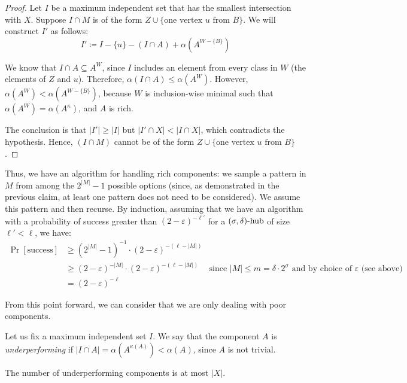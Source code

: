 \begin{proof}
    Let $I$ be a maximum independent set that has the smallest intersection with $X$. Suppose $I \cap M$ is of the form $Z \cup \{\text{one vertex $u$ from $B$}\}$. We will construct $I'$ as follows: $$I'\coloneqq I - \{u\} - (I \cap A) + \alpha(A^{W - \{B\}})$$

     We know that $I \cap A \subseteq A^W$, since $I$ includes an element from every class in $W$ (the elements of $Z$ and $u$). Therefore, $\alpha(I \cap A) \leq \alpha(A^W)$. However, $\alpha(A^W) < \alpha(A^{W - \{B\}})$, because $W$ is inclusion-wise minimal such that $\alpha(A^W) = \alpha(A^\kappa)$, and $A$ is rich.

    The conclusion is that $|I'| \geq |I|$ but $|I' \cap X| < |I \cap X|$, which contradicts the hypothesis. Hence, $(I \cap M)$ cannot be of the form $Z \cup \{\text{one vertex $u$ from $B$}\}$. 
\end{proof}

Thus, we have an algorithm for handling rich components: we sample a pattern in $M$ from among the $2^{|M|} - 1$ possible options (since, as demonstrated in the previous claim, at least one pattern does not need to be considered). We assume this pattern and then recurse. By induction, assuming that we have an algorithm with a probability of success greater than $(2-\varepsilon)^{-\ell'}$ for a $(\sigma, \delta)\text{-hub}$ of size $\ell' < \ell$, we have:
\begin{align*}
    \Pr[\text{success}] &\geq (2^{|M|} - 1)^{-1}\cdot(2 - \varepsilon)^{-(\ell-|M|)}\\
    &\geq (2 - \varepsilon)^{-|M|}\cdot(2 - \varepsilon)^{-(\ell-|M|)}& \text{since $|M| \leq m = \delta \cdot 2^\sigma$ and by choice of $\varepsilon$ (see above)}\\
    &= (2 - \varepsilon)^{-\ell}
\end{align*}

From this point forward, we can consider that we are only dealing with poor components.

\medskip

Let us fix a maximum independent set $I$. We say that the component $A$ is \emph{underperforming} if $|I \cap A| = \alpha(A^{\kappa(A)}) < \alpha(A)$, since $A$ is not trivial.

\begin{observation}
    The number of underperforming components is at most $|X|$.
\end{observation}

